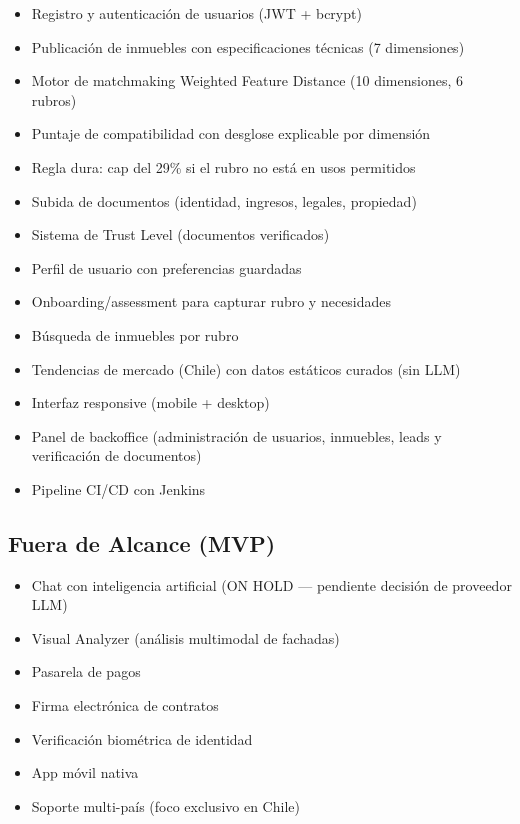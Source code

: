 \documentclass[11pt,a4paper]{article}
\begin{document}
\begin{itemize}
    \item Registro y autenticación de usuarios (JWT + bcrypt)
    \item Publicación de inmuebles con especificaciones técnicas (7 dimensiones)
    \item Motor de matchmaking Weighted Feature Distance (10 dimensiones, 6 rubros)
    \item Puntaje de compatibilidad con desglose explicable por dimensión
    \item Regla dura: cap del 29\% si el rubro no está en usos permitidos
    \item Subida de documentos (identidad, ingresos, legales, propiedad)
    \item Sistema de Trust Level (documentos verificados)
    \item Perfil de usuario con preferencias guardadas
    \item Onboarding/assessment para capturar rubro y necesidades
    \item Búsqueda de inmuebles por rubro
    \item Tendencias de mercado (Chile) con datos estáticos curados (sin LLM)
    \item Interfaz responsive (mobile + desktop)
    \item Panel de backoffice (administración de usuarios, inmuebles, leads y verificación de documentos)
    \item Pipeline CI/CD con Jenkins
\end{itemize}

\subsection{Fuera de Alcance (MVP)}

\begin{itemize}
    \item Chat con inteligencia artificial (ON HOLD — pendiente decisión de proveedor LLM)
    \item Visual Analyzer (análisis multimodal de fachadas)
    \item Pasarela de pagos
    \item Firma electrónica de contratos
    \item Verificación biométrica de identidad
    \item App móvil nativa
    \item Soporte multi-país (foco exclusivo en Chile)
\end{itemize}
\end{document}
